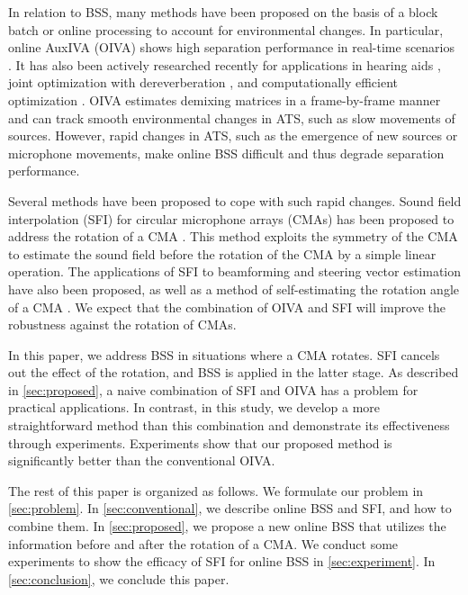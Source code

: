 \documentclass[sip,biber]{now-journal}
\begin{document}
In relation to BSS, many methods have been proposed on the basis of a block batch \cite{Koldovsky:2019:ICASSP,Koldovsky:2021:SP,Jansky:2022:ASMP} or online processing \cite{Kim:2010:CASI,Taniguchi:2014:HSCMA} to account for environmental changes.
In particular, online AuxIVA (OIVA) shows high separation performance in real-time scenarios \cite{Taniguchi:2014:HSCMA}.
It has also been actively researched recently for applications in hearing aids \cite{Sunohara:2017:ICASSP}, joint optimization with dereverberation \cite{Ueda:2021:ICASSP}, and computationally efficient optimization \cite{Nakashima:2023:ICASSP}.
OIVA estimates demixing matrices in a frame-by-frame manner and can track smooth environmental changes in ATS, such as slow movements of sources.
However, rapid changes in ATS, such as the emergence of new sources or microphone movements, make online BSS difficult and thus degrade separation performance.

Several methods have been proposed to cope with such rapid changes.
Sound field interpolation (SFI) for circular microphone arrays (CMAs) has been proposed to address the rotation of a CMA \cite{Wakabayashi:2023:ASLP}.
This method exploits the symmetry of the CMA to estimate the sound field before the rotation of the CMA by a simple linear operation.
The applications of SFI to beamforming \cite{Wakabayashi:2021:ICASSP} and steering vector estimation \cite{Wakabayashi:2021:ASJ:A} have also been proposed,
as well as a method of self-estimating the rotation angle of a CMA \cite{Lian:2021:APSIPA}.
We expect that the combination of OIVA and SFI will improve the robustness against the rotation of CMAs.

In this paper, we address BSS in situations where a CMA rotates.
SFI cancels out the effect of the rotation, and BSS is applied in the latter stage.
As described in \cref{sec:proposed}, a naive combination of SFI and OIVA has a problem for practical applications.
In contrast, in this study, we develop a more straightforward method than this combination and demonstrate its effectiveness through experiments.
Experiments show that our proposed method is significantly better than the conventional OIVA.

The rest of this paper is organized as follows.
We formulate our problem in \cref{sec:problem}.
In \cref{sec:conventional}, we describe online BSS and SFI, and how to combine them.
In \cref{sec:proposed}, we propose a new online BSS that utilizes the information before and after the rotation of a CMA.
We conduct some experiments to show the efficacy of SFI for online BSS in \cref{sec:experiment}.
In \cref{sec:conclusion}, we conclude this paper.
\end{document}
